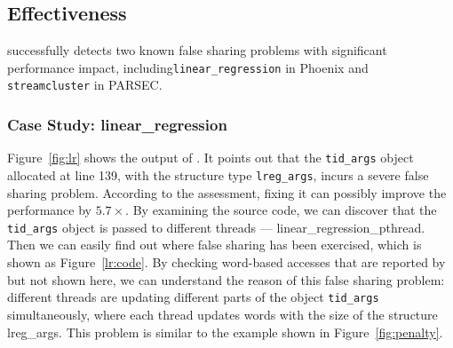 
 
\subsection{Effectiveness}
\label{sec:effectiveness}

\cheetah{} successfully detects two known false sharing problems with significant performance impact, including\texttt{linear\_regression} in Phoenix and \texttt{streamcluster} in PARSEC. 



\subsubsection{Case Study: linear\_regression}
Figure~\ref{fig:lr} shows the output of \cheetah{}. It points out that the {\tt tid\_args} object allocated at line 139, with the structure type {\tt lreg\_args}, incurs a severe false sharing problem. According to the assessment, fixing it can possibly improve the performance by $5.7\times$. By examining the source code, we can discover that the {\tt tid\_args} object is passed to different threads --- linear\_regression\_pthread. Then we can easily find out where false sharing has been exercised, which is shown as Figure~\ref{lr:code}. By checking word-based accesses that are reported by \cheetah{} but not shown here, we can understand the reason of this false sharing problem: different threads are updating different parts of the object {\tt tid\_args} simultaneously, where each thread updates words with the size of the structure lreg\_args. This problem is similar to the example shown in Figure~\ref{fig:penalty}. 

